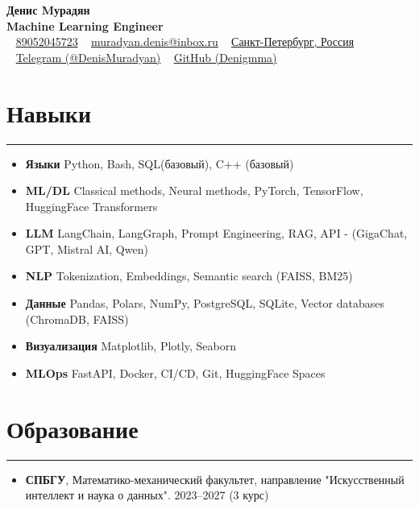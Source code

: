 \documentclass[a4paper,14pt]{article}
\begin{document}
\begin{center}
    {\Huge \bfseries Денис Mурадян} \\
    \vspace{0.5em}
    {\Large \bfseries Machine Learning Engineer} \\
    \vspace{1em}
    \faPhone~ \href{tel:89052045723}{89052045723} \hspace{1em}
    \faEnvelope~ \href{mailto:muradyan.denis@inbox.ru}{muradyan.denis@inbox.ru} \hspace{1em}
    \faHome~ \href{https://yandex.ru/maps/-/CHRjvNpm}{Санкт-Петербург, Россия} \\
    \vspace{0.5em}
    \faTelegram~ \href{https://t.me/DenisMuradyan}{Telegram (@DenisMuradyan)}
    \faGithub~ \href{https://github.com/Denigmma}{GitHub (Denigmma)} \hspace{1em}
\end{center}

\section*{Навыки}
\hrule
\vspace{0.5em}
\begin{itemize}
    \item \textbf{Языки} Python, Bash, SQL(базовый), C++ (базовый)
    \item \textbf{ML/DL} Classical methods, Neural methods, PyTorch, TensorFlow, HuggingFace Transformers
    \item \textbf{LLM} LangChain, LangGraph, Prompt Engineering, RAG, API - (GigaChat, GPT, Mistral AI, Qwen)
    \item \textbf{NLP} Tokenization, Embeddings, Semantic search (FAISS, BM25)
    \item \textbf{Данные} Pandas, Polars, NumPy, PostgreSQL, SQLite, Vector databases (ChromaDB, FAISS)
    \item \textbf{Визуализация} Matplotlib, Plotly, Seaborn
    \item \textbf{MLOps} FastAPI, Docker, CI/CD, Git, HuggingFace Spaces
\end{itemize}

\section*{Образование}
\hrule
\vspace{0.5em}
\begin{itemize}
    \item \textbf{СПБГУ}, Математико-механический факультет, направление "Искусственный интеллект и наука о данных". 2023–2027 (3 курс)
\end{itemize}
\end{document}
